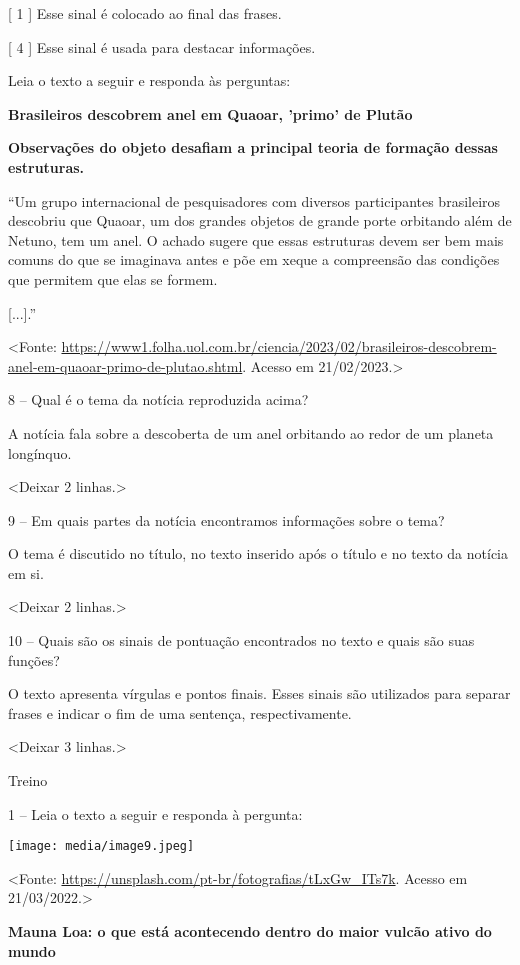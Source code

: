 {[} 1 {]} Esse sinal é colocado ao final das frases.

{[} 4 {]} Esse sinal é usada para destacar informações.

Leia o texto a seguir e responda às perguntas:

\textbf{Brasileiros descobrem anel em Quaoar, 'primo' de Plutão}

\textbf{Observações do objeto desafiam a principal teoria de formação
dessas estruturas.}

``Um grupo internacional de pesquisadores com diversos participantes
brasileiros descobriu que Quaoar, um dos grandes objetos de grande porte
orbitando além de Netuno, tem um anel. O achado sugere que essas
estruturas devem ser bem mais comuns do que se imaginava antes e põe em
xeque a compreensão das condições que permitem que elas se formem.

{[}...{]}.''

\textless{}Fonte:
\url{https://www1.folha.uol.com.br/ciencia/2023/02/brasileiros-descobrem-anel-em-quaoar-primo-de-plutao.shtml}.
Acesso em 21/02/2023.\textgreater{}

8 -- Qual é o tema da notícia reproduzida acima?

A notícia fala sobre a descoberta de um anel orbitando ao redor de um
planeta longínquo.

\textless{}Deixar 2 linhas.\textgreater{}

9 -- Em quais partes da notícia encontramos informações sobre o tema?

O tema é discutido no título, no texto inserido após o título e no texto
da notícia em si.

\textless{}Deixar 2 linhas.\textgreater{}

10 -- Quais são os sinais de pontuação encontrados no texto e quais são
suas funções?

O texto apresenta vírgulas e pontos finais. Esses sinais são utilizados
para separar frases e indicar o fim de uma sentença, respectivamente.

\textless{}Deixar 3 linhas.\textgreater{}

Treino

1 -- Leia o texto a seguir e responda à pergunta:

\texttt{[image: media/image9.jpeg]}

\textless{}Fonte:
\url{https://unsplash.com/pt-br/fotografias/tLxGw_ITs7k}. Acesso em
21/03/2022.\textgreater{}

\textbf{Mauna Loa: o que está acontecendo dentro do maior vulcão ativo
do mundo}

